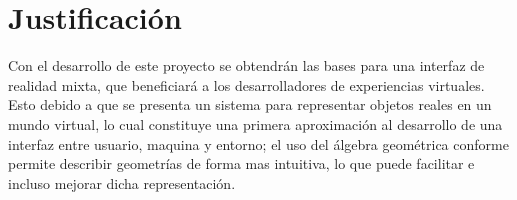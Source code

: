 \section{Justificación}

	Con el desarrollo de este proyecto se obtendrán las bases para una interfaz de realidad mixta, que beneficiará a los desarrolladores de experiencias virtuales. Esto debido a que se presenta un sistema para representar objetos reales en un mundo virtual, lo cual constituye una primera aproximación al desarrollo de una interfaz entre usuario, maquina y entorno; el uso del álgebra geométrica conforme permite describir geometrías de forma mas intuitiva, lo que puede facilitar e incluso mejorar dicha representación. 
